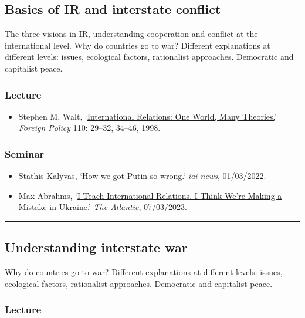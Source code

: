 \documentclass[12pt, a4paper]{article}
\begin{document}
\subsection{Basics of IR and interstate conflict}

The three visions in IR, understanding cooperation and conflict at the international level. Why do countries go to war? Different explanations at different levels: issues, ecological factors, rationalist approaches. Democratic and capitalist peace.

\subsubsection*{Lecture}

\begin{itemize}
\setlength\itemsep{0pt}
\item Stephen M. Walt, `\href{https://doi.org/10.2307/1149275}{International Relations: One World, Many Theories.}' \textit{Foreign Policy} 110: 29--32, 34--46, 1998.
\end{itemize}

\subsubsection*{Seminar}

\begin{itemize}
  \item Stathis Kalyvas, `\href{https://iai.tv/articles/how-we-got-putin-so-wrong-auid-2063}{How we got Putin so wrong}.` \textit{iai news}, 01/03/2022.
  \item Max Abrahms, `\href{https://www.theatlantic.com/ideas/archive/2023/03/russia-ukraine-war-pundits-history-international-relations/673293/}{I Teach International Relations. I Think We’re Making a Mistake in Ukraine.}' \textit{The Atlantic}, 07/03/2023.
\end{itemize}

\hrule %

\subsection{Understanding interstate war}\label{interstate}

Why do countries go to war? Different explanations at different levels: issues, ecological factors, rationalist approaches. Democratic and capitalist peace.

\subsubsection*{Lecture}
\end{document}
